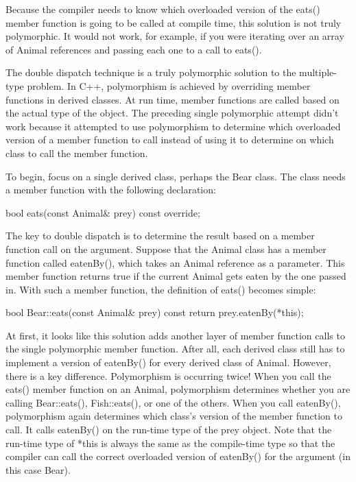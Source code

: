 Because the compiler needs to know which overloaded version of the eats() member function is going to be called at compile time, this solution is not truly polymorphic. It would not work, for example, if you were iterating over an array of Animal references and passing each one to a call to eats().


The double dispatch technique is a truly polymorphic solution to the multiple-type problem. In C++, polymorphism is achieved by overriding member functions in derived classes. At run time, member functions are called based on the actual type of the object. The preceding single polymorphic attempt didn’t work because it attempted to use polymorphism to determine which overloaded version of a member function to call instead of using it to determine on which class to call the member function.

To begin, focus on a single derived class, perhaps the Bear class. The class needs a member function with the following declaration:

\begin{cpp}
bool eats(const Animal& prey) const override;
\end{cpp}

The key to double dispatch is to determine the result based on a member function call on the argument. Suppose that the Animal class has a member function called eatenBy(), which takes an Animal reference as a parameter. This member function returns true if the current Animal gets eaten by the one passed in. With such a member function, the definition of eats() becomes simple:

\begin{cpp}
bool Bear::eats(const Animal& prey) const
{
    return prey.eatenBy(*this);
}
\end{cpp}

At first, it looks like this solution adds another layer of member function calls to the single polymorphic member function. After all, each derived class still has to implement a version of eatenBy() for every derived class of Animal. However, there is a key difference. Polymorphism is occurring twice! When you call the eats() member function on an Animal, polymorphism determines whether you are calling Bear::eats(), Fish::eats(), or one of the others. When you call eatenBy(), polymorphism again determines which class’s version of the member function to call. It calls eatenBy() on the run-time type of the prey object. Note that the run-time type of *this is always the same as the compile-time type so that the compiler can call the correct overloaded version of eatenBy() for the argument (in this case Bear).


